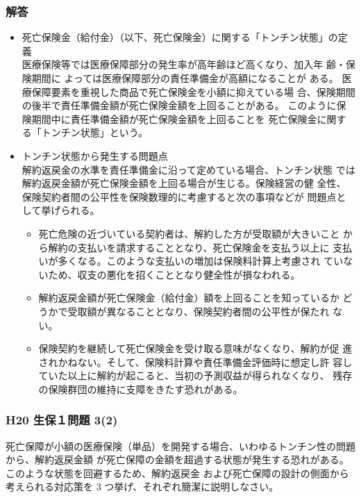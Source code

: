 \documentclass[report,gutter=10mm,fore-edge=10mm,uplatex,dvipdfmx]{jlreq}
\begin{document}
\subsubsection{解答}
\begin{itemize}
 \item  死亡保険金（給付金）（以下、死亡保険金）に関する「トンチン状態」の定義\\
 医療保険等では医療保障部分の発生率が高年齢ほど高くなり、加入年 齢・保険期間に
よっては医療保障部分の責任準備金が高額になることが ある。
医療保障要素を重視した商品で死亡保険金を小額に抑えている場
 合、保険期間の後半で責任準備金額が死亡保険金額を上回ることがある。
 このように保険期間中に責任準備金額が死亡保険金額を上回ることを
 死亡保険金に関する「トンチン状態」という。
 \item  トンチン状態から発生する問題点\\
 解約返戻金の水準を責任準備金に沿って定めている場合、トンチン状態
 では解約返戻金額が死亡保険金額を上回る場合が生じる。保険経営の健
 全性、保険契約者間の公平性を保険数理的に考慮すると次の事項などが
 問題点として挙げられる。
\begin{itemize}
 \item  死亡危険の近づいている契約者は、解約した方が受取額が大きいこと
 から解約の支払いを請求することとなり、死亡保険金を支払う以上に
 支払いが多くなる。このような支払いの増加は保険料計算上考慮され
 ていないため、収支の悪化を招くこととなり健全性が損なわれる。
 \item  解約返戻金額が死亡保険金（給付金）額を上回ることを知っているか
 どうかで受取額が異なることとなり、保険契約者間の公平性が保たれ
 ない。
 \item  保険契約を継続して死亡保険金を受け取る意味がなくなり、解約が促
 進されかねない。そして、保険料計算や責任準備金評価時に想定し許
 容していた以上に解約が起こると、当初の予測収益が得られなくなり、
 残存の保険群団の維持に支障をきたす恐れがある。
\end{itemize}
\end{itemize}

\subsubsection{H20 生保１問題 3(2)}
死亡保障が小額の医療保険（単品）を開発する場合、いわゆるトンチン性の問題から、解約返戻金額
が死亡保障の金額を超過する状態が発生する恐れがある。このような状態を回避するため、解約返戻金
および死亡保障の設計の側面から考えられる対応策を 3 つ挙げ、それぞれ簡潔に説明しなさい。
\end{document}
